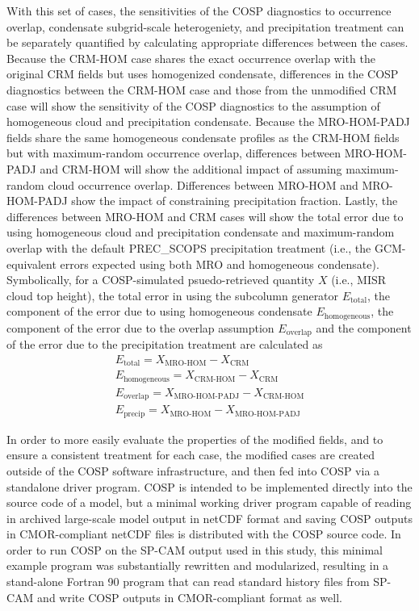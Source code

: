 With this set of cases, the sensitivities of the COSP diagnostics to
occurrence overlap, condensate subgrid-scale heterogeniety, and
precipitation treatment can be separately quantified by calculating
appropriate differences between the cases. Because the CRM-HOM case
shares the exact occurrence overlap with the original CRM fields but
uses homogenized condensate, differences in the COSP diagnostics between
the CRM-HOM case and those from the unmodified CRM case will show the
sensitivity of the COSP diagnostics to the assumption of homogeneous
cloud and precipitation condensate. Because the MRO-HOM-PADJ fields
share the same homogeneous condensate profiles as the CRM-HOM fields but
with maximum-random occurrence overlap, differences between MRO-HOM-PADJ
and CRM-HOM will show the additional impact of assuming maximum-random
cloud occurrence overlap. Differences between MRO-HOM and MRO-HOM-PADJ
show the impact of constraining precipitation fraction. Lastly, the
differences between MRO-HOM and CRM cases will show the total error due
to using homogeneous cloud and precipitation condensate and
maximum-random overlap with the default PREC\_SCOPS precipitation
treatment (i.e., the GCM-equivalent errors expected using both MRO and
homogeneous condensate). Symbolically, for a COSP-simulated
psuedo-retrieved quantity \(X\) (i.e., MISR cloud top height), the total
error in using the subcolumn generator \(E_\textrm{total}\), the
component of the error due to using homogeneous condensate
\(E_\textrm{homogeneous}\), the component of the error due to the
overlap assumption \(E_\textrm{overlap}\) and the component of the error
due to the precipitation treatment are calculated as \[\begin{gathered} 
    E_\textrm{total} = X_\textrm{MRO-HOM} - X_\textrm{CRM} \\
    E_\textrm{homogeneous} = X_\textrm{CRM-HOM} - X_\textrm{CRM} \\
    E_\textrm{overlap} = X_\textrm{MRO-HOM-PADJ} - X_\textrm{CRM-HOM} \\
    E_\textrm{precip} = X_\textrm{MRO-HOM} - X_\textrm{MRO-HOM-PADJ}
\end{gathered}\]

In order to more easily evaluate the properties of the modified fields,
and to ensure a consistent treatment for each case, the modified cases
are created outside of the COSP software infrastructure, and then fed
into COSP via a standalone driver program. COSP is intended to be
implemented directly into the source code of a model, but a minimal
working driver program capable of reading in archived large-scale model
output in netCDF format and saving COSP outputs in CMOR-compliant netCDF
files is distributed with the COSP source code. In order to run COSP on
the SP-CAM output used in this study, this minimal example program was
substantially rewritten and modularized, resulting in a stand-alone
Fortran 90 program that can read standard history files from SP-CAM and
write COSP outputs in CMOR-compliant format as well.

